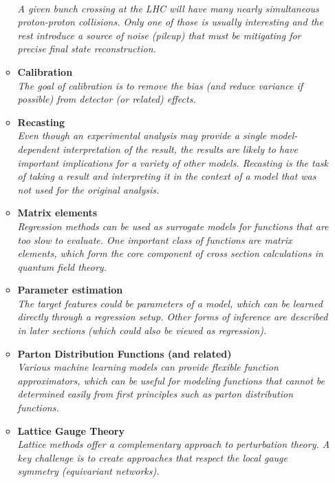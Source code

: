 \documentclass[12pt,letterpaper]{article}
\begin{document}
\begin{itemize}
\begin{itemize}
		\\\textit{A given bunch crossing at the LHC will have many nearly simultaneous proton-proton collisions.  Only one of those is usually interesting and the rest introduce a source of noise (pileup) that must be mitigating for precise final state reconstruction.}
		\item \textbf{Calibration}~\cite{Cheong:2019upg,ATL-PHYS-PUB-2020-001,ATL-PHYS-PUB-2018-013,Hooberman:DLPS2017,Kasieczka:2020vlh,Sirunyan:2019wwa,Baldi:2020hjm,Du:2020pmp}
		\\\textit{The goal of calibration is to remove the bias (and reduce variance if possible) from detector (or related) effects.}
		\item \textbf{Recasting}~\cite{Caron:2017hku,Bertone:2016mdy,1806026}
		\\\textit{Even though an experimental analysis may provide a single model-dependent interpretation of the result, the results are likely to have important implications for a variety of other models.  Recasting is the task of taking a result and interpreting it in the context of a model that was not used for the original analysis.}
		\item \textbf{Matrix elements}~\cite{Badger:2020uow,Bishara:2019iwh,1804325,Bury:2020ewi}
		\\\textit{Regression methods can be used as surrogate models for functions that are too slow to evaluate.  One important class of functions are matrix elements, which form the core component of cross section calculations in quantum field theory.}
		\item \textbf{Parameter estimation}~\cite{Lei:2020ucb,1808105,Lazzarin:2020uvv}
		\\\textit{The target features could be parameters of a model, which can be learned directly through a regression setup.  Other forms of inference are described in later sections (which could also be viewed as regression).}
		\item \textbf{Parton Distribution Functions (and related)}~\cite{DelDebbio:2020rgv,Grigsby:2020auv,Rossi:2020sbh,Carrazza:2021hny}
		\\\textit{Various machine learning models can provide flexible function approximators, which can be useful for modeling functions that cannot be determined easily from first principles such as parton distribution functions.}
		\item \textbf{Lattice Gauge Theory}~\cite{Kanwar:2003.06413,Favoni:2020reg,Bulusu:2021rqz}
		\\\textit{Lattice methods offer a complementary approach to perturbation theory.  A key challenge is to create approaches that respect the local gauge symmetry (equivariant networks).}

\end{itemize}
\end{itemize}
\end{document}
